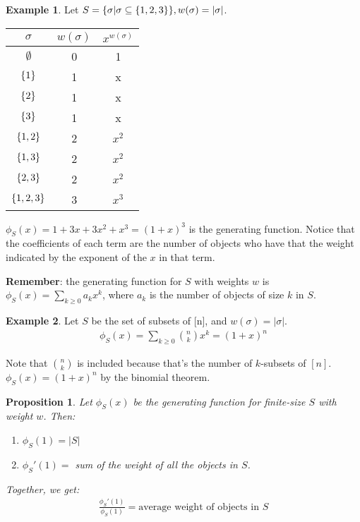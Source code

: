 \documentclass[]{article}
\newtheorem*{proposition}{Proposition}
\theoremstyle{definition}
\newtheorem{ex}{Example}[section]
\newcommand{\lecture}[1]{\marginpar{{\footnotesize $\leftarrow$ \underline{#1}}}}
\DeclarePairedDelimiter{\set}{\lbrace}{\rbrace}
\begin{document}
			\begin{ex}
				Let $S = \set{\sigma | \sigma \subseteq \set{1, 2, 3} }, w(\sigma) = |\sigma|$.

				\begin{center}
					\begin{tabular}{c|c|c}
						$\sigma$ & $w(\sigma)$ & $x^{w(\sigma)}$ \\ \hline
						$\emptyset$ & 0 & 1 \\
						$\set{1}$ & 1 & x \\
						$\set{2}$ & 1 & x \\
						$\set{3}$ & 1 & x \\
						$\set{1, 2}$ & 2 & $x^2$ \\
						$\set{1, 3}$ & 2 & $x^2$ \\
						$\set{2, 3}$ & 2 & $x^2$ \\
						$\set{1, 2, 3}$ & 3 & $x^3$ \\
					\end{tabular}
				\end{center}

				$\phi_S(x) = 1 + 3x + 3x^2 + x^3 = (1 + x)^3$ is the generating function. Notice that the coefficients of each term are the number of objects who have that the weight indicated by the exponent of the $x$ in that term.
			\end{ex}

			\textbf{Remember}: the generating function for $S$ with weights $w$ is $\phi_S(x) = \sum_{k \ge 0} a_k x^k$, where $a_k$ is the number of objects of size $k$ in $S$.

			\begin{ex}
				\lecture{January 14, 2013}
				Let $S$ be the set of subsets of [n], and $w(\sigma) = |\sigma|$.
				\begin{align*}
					\phi_S(x) = \sum_{k \ge 0} \binom{n}{k} x^k = (1 + x)^n
				\end{align*}

				Note that $\binom{n}{k}$ is included because that's the number of $k$-subsets of $[n]$. $\phi_S(x) = (1 + x)^n$ by the binomial theorem.
			\end{ex}

			\begin{proposition}
				Let $\phi_S(x)$ be the generating function for finite-size $S$ with weight $w$. Then:
				\begin{enumerate}
					\item $\phi_S(1) = |S|$
					\item $\phi_S'(1) = $ sum of the weight of all the objects in $S$.
				\end{enumerate}

				Together, we get:
				\begin{align*}
					\frac{\phi_S'(1)}{\phi_S(1)} = \text{average weight of objects in } S
				\end{align*}
			\end{proposition}
\end{document}
